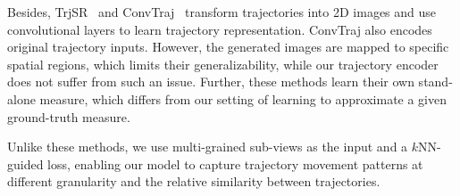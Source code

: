 Besides, TrjSR~\cite{trjsr} and ConvTraj~\cite{Convtraj} transform trajectories into 2D images and use convolutional layers to learn trajectory representation.  ConvTraj also encodes original trajectory inputs. However, the generated images are mapped to  specific spatial regions, which limits their generalizability, while our trajectory encoder does not suffer from such an issue. Further, these methods learn their own stand-alone measure, which differs from our setting of learning to approximate a given ground-truth measure. 

Unlike these methods, we use multi-grained sub-views as the input and a $k$NN-guided loss, enabling our model to capture trajectory movement patterns at different granularity and the relative similarity between trajectories.